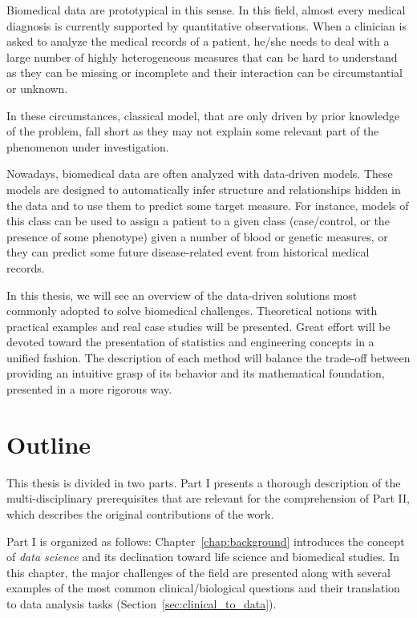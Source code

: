 Biomedical data are prototypical in this sense. In this field, almost every medical diagnosis is currently supported by quantitative observations.
When a clinician is asked to analyze the medical records of a patient, he/she needs to deal with a large number of highly heterogeneous measures that can be hard to understand as they can be missing or incomplete and their interaction can be circumstantial or unknown.

In these circumstances, classical model, that are only driven by prior knowledge of the problem, fall short as they may not explain some relevant part of the phenomenon under investigation.

Nowadays, biomedical data are often analyzed with data-driven models. These models are designed to automatically infer structure and relationships hidden in the data and to use them to predict some target measure. For instance, models of this class can be used to assign a patient to a given class (\eg case/control, or the presence of some phenotype) given a number of blood or genetic measures, or they can predict some future disease-related event from historical medical records.

In this thesis, we will see an overview of the data-driven solutions most commonly adopted to solve biomedical challenges. Theoretical notions with practical examples and real case studies will be presented. Great effort will be devoted toward the presentation of statistics and engineering concepts in a unified fashion. The description of each method will balance the trade-off between providing an intuitive grasp of its behavior and its mathematical foundation, presented in a more rigorous way.

\section{Outline}

This thesis is divided in two parts. Part I presents a thorough description of the multi-disciplinary prerequisites that are relevant for the comprehension of Part II, which describes the original contributions of the work.

Part I is organized as follows: Chapter~\ref{chap:background} introduces the concept of \textit{data science} and its declination toward life science and biomedical studies. In this chapter, the major challenges of the field are presented along with several examples of the most common clinical/biological questions and their translation to data analysis tasks (Section~\ref{sec:clinical_to_data}).

